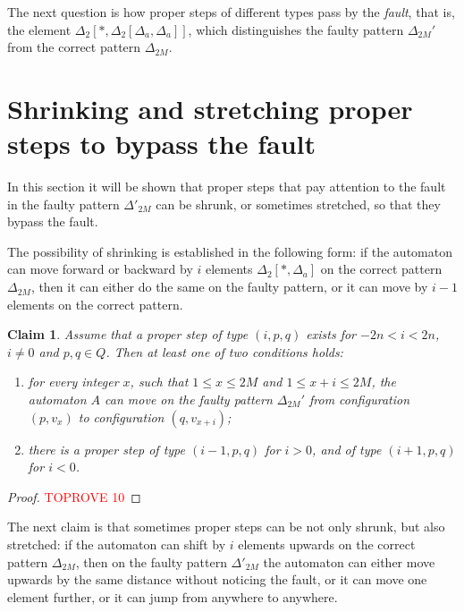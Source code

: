 \documentclass[12pt,a4paper]{article}
\newtheorem{claim}{Claim}
\theoremstyle{definition}
\begin{document}
The next question is how proper steps of different types
pass by the \emph{fault}, that is,
the element $\Delta_2[*,\Delta_2[\Delta_a,\Delta_a]]$,
which distinguishes the faulty pattern $\Delta_{2M}'$
from the correct pattern $\Delta_{2M}$.






\section{Shrinking and stretching proper steps to bypass the fault}\label{section_stretched_and_shrunk_moves}

In this section it will be shown that proper steps
that pay attention to the fault in the faulty pattern $\Delta'_{2M}$
can be shrunk, or sometimes stretched,
so that they bypass the fault.

The possibility of shrinking is established in the following form:
if the automaton can move forward or backward by $i$ elements $\Delta_2[*,\Delta_a]$
on the correct pattern $\Delta_{2M}$,
then it can either do the same on the faulty pattern,
or it can move by $i-1$ elements on the correct pattern.

\begin{claim}\label{claim_shrunk_moves}
Assume that a proper step of type $(i,p,q)$ exists
for $-2n < i < 2n$, $i \neq 0$ and $p,q \in Q$.
Then at least one of two conditions holds:
\begin{enumerate}\renewcommand{\theenumi}{\Roman{enumi}}
\item	\label{claim_shrunk_moves__step_i_on_Delta_prime}
	for every integer $x$,
	such that $1 \leqslant x \leqslant 2M$ and $1 \leqslant x+i \leqslant 2M$, 
	the automaton $A$ can move on the faulty pattern $\Delta_{2M}'$ 
	from configuration $(p,v_x)$ to configuration $(q,v_{x+i})$;
\item	\label{claim_shrunk_moves__step_i_minus_1}
	there is a proper step of type $(i-1,p,q)$ for $i>0$,
	and of type $(i+1,p,q)$ for $i<0$.
\end{enumerate}
\end{claim}

\begin{proof}\textcolor{red}{TOPROVE 10}\end{proof}

The next claim is that sometimes proper steps can be not only shrunk,
but also stretched:
if the automaton can shift by $i$ elements upwards on the correct pattern $\Delta_{2M}$,
then on the faulty pattern $\Delta'_{2M}$
the automaton can either move upwards by the same distance without noticing the fault,
or it can move one element further,
or it can jump from anywhere to anywhere.
\end{document}

